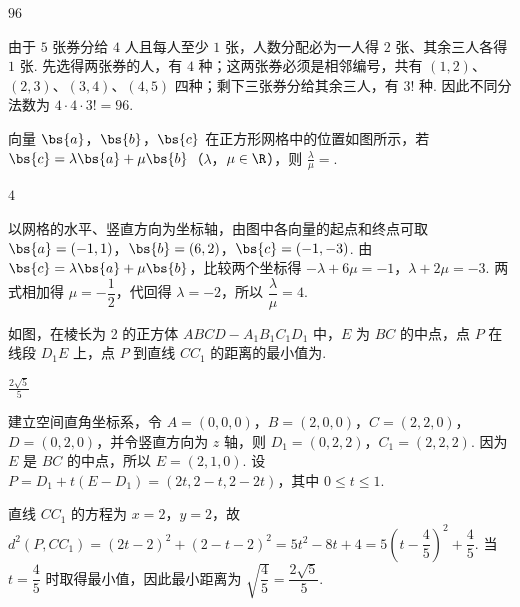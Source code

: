 \begin{answer}
\(96\)
\end{answer}

\begin{solution}

由于 \(5\) 张券分给 \(4\) 人且每人至少 \(1\) 张，人数分配必为一人得 \(2\) 张、其余三人各得 \(1\) 张. 先选得两张券的人，有 \(4\) 种；这两张券必须是相邻编号，共有 \((1,2)\)、\((2,3)\)、\((3,4)\)、\((4,5)\) 四种；剩下三张券分给其余三人，有 \(3!\) 种. 因此不同分法数为 \(4\cdot4\cdot3!=96\).
\end{solution}

\begin{problem}
向量 \(\bs{a}\)，\(\bs{b}\)，\(\bs{c}\) 在正方形网格中的位置如图所示，若 \(\bs{c} = \lambda \bs{a} + \mu \bs{b}\)（\(\lambda\)，\(\mu \in \R\)），则 \(\frac{\lambda}{\mu} =\)\fillinblank{}.
\end{problem}

\begin{answer}
\(4\)
\end{answer}

\begin{solution}

以网格的水平、竖直方向为坐标轴，由图中各向量的起点和终点可取
\(\bs{a}=(-1,1)\)，\(\bs{b}=(6,2)\)，\(\bs{c}=(-1,-3)\). 由
\(\bs{c}=\lambda\bs{a}+\mu\bs{b}\)，比较两个坐标得
\(-\lambda+6\mu=-1\)，\(\lambda+2\mu=-3\). 两式相加得 \(\mu=-\dfrac12\)，代回得 \(\lambda=-2\)，所以
\(\dfrac{\lambda}{\mu}=4\).
\end{solution}

\begin{problem}
如图，在棱长为 2 的正方体 \(ABCD - A_{1}B_{1}C_{1}D_{1}\) 中，\(E\) 为 \(BC\) 的中点，点 \(P\) 在线段 \(D_{1}E\) 上，点 \(P\) 到直线 \(CC_{1}\) 的距离的最小值为\fillinblank{}.
\end{problem}

\begin{answer}
\(\frac{2\sqrt{5}}{5}\)
\end{answer}

\begin{solution}

建立空间直角坐标系，令
\(A=(0,0,0)\)，\(B=(2,0,0)\)，\(C=(2,2,0)\)，\(D=(0,2,0)\)，并令竖直方向为 \(z\) 轴，则 \(D_1=(0,2,2)\)，\(C_1=(2,2,2)\). 因为 \(E\) 是 \(BC\) 的中点，所以 \(E=(2,1,0)\). 设
\(P=D_1+t(E-D_1)=(2t,2-t,2-2t)\)，其中 \(0\leqslant t\leqslant1\).

直线 \(CC_1\) 的方程为 \(x=2\)，\(y=2\)，故
\(d^2(P,CC_1)=(2t-2)^2+(2-t-2)^2=5t^2-8t+4=5\left(t-\dfrac45\right)^2+\dfrac45\). 当 \(t=\dfrac45\) 时取得最小值，因此最小距离为
\(\sqrt{\dfrac45}=\dfrac{2\sqrt5}{5}\).
\end{solution}

